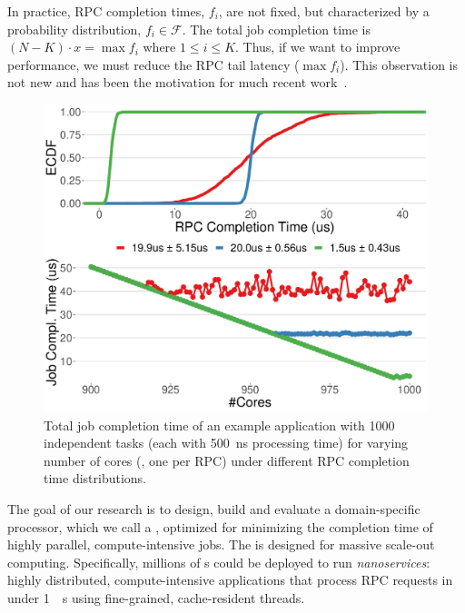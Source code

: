 In practice, RPC completion times, $f_i$, are not fixed, but characterized by a probability distribution, $f_i \in \mathcal{F}$. 
The total job completion time is $(N - K) \cdot x =\max{f_i}$ where $1\le i \le K$. Thus, if we want to improve performance, we must reduce the RPC tail latency ($\max{f_i}$). 
This observation is not new and has been the motivation for much recent work~\cite{shinjuku, shenango, rpcvalet}. 

\begin{figure}
  \includegraphics[width=0.9\linewidth]{./figures/nano-comptime}
  \caption{Total job completion time of an example application with 1000 independent tasks (each with \SI{500}{ns} processing time) for varying number of cores (\ie, one per RPC) under different RPC completion time distributions.}
  \label{fig:nanoservice-sim}
\end{figure}

The goal of our research is to design, build and evaluate a domain-specific processor, which we call a {\em \name{}}, optimized for minimizing the completion time of highly parallel, compute-intensive jobs. The \name{} is designed for massive scale-out computing. 
Specifically, millions of \name{}s could be deployed to run {\em nanoservices}: highly distributed, compute-intensive applications that process RPC requests in under \SI{1}{\mu s} using fine-grained, cache-resident threads.

